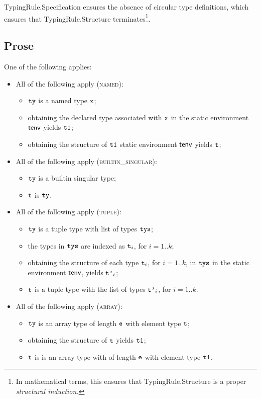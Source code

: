 \documentclass{book}
\newcommand\ProseOrTypeError[0]{\ProseTerminateAs{\TypeErrorConfig}}
\begin{document}
TypingRule.Specification ensures the absence of circular type definitions,
which ensures that TypingRule.Structure terminates\footnote{In mathematical terms,
this ensures that TypingRule.Structure is a proper \emph{structural induction.}}.

\subsection{Prose}
One of the following applies:
\begin{itemize}
\item All of the following apply (\textsc{named}):
  \begin{itemize}
  \item $\texttt{ty}$ is a named type $\texttt{x}$;
  \item obtaining the declared type associated with $\texttt{x}$ in the static environment $\textsf{tenv}$ yields $\texttt{t1}$\ProseOrTypeError;
  \item obtaining the structure of $\texttt{t1}$ static environment $\textsf{tenv}$ yields $\texttt{t}$\ProseOrTypeError;
  \end{itemize}
\item All of the following apply (\textsc{builtin\_singular}):
  \begin{itemize}
  \item $\texttt{ty}$ is a builtin singular type;
  \item $\texttt{t}$ is $\texttt{ty}$.
  \end{itemize}
\item All of the following apply (\textsc{tuple}):
  \begin{itemize}
  \item $\texttt{ty}$ is a tuple type with list of types $\texttt{tys}$;
  \item the types in $\texttt{tys}$ are indexed as $\texttt{t}_i$, for $i=1..k$;
  \item obtaining the structure of each type $\texttt{t}_i$, for $i=1..k$, in $\texttt{tys}$ in the static environment $\textsf{tenv}$,
  yields $\texttt{t'}_i$\ProseOrTypeError;
  \item $\texttt{t}$ is a tuple type with the list of types $\texttt{t'}_i$, for $i=1..k$.
  \end{itemize}
\item All of the following apply (\textsc{array}):
  \begin{itemize}
    \item $\texttt{ty}$ is an array type of length $\texttt{e}$ with element type $\texttt{t}$;
    \item obtaining the structure of $\texttt{t}$ yields $\texttt{t1}$\ProseOrTypeError;
    \item $\texttt{t}$ is is an array type with of length $\texttt{e}$ with element type $\texttt{t1}$.

\end{itemize}
\end{itemize}
\end{document}
